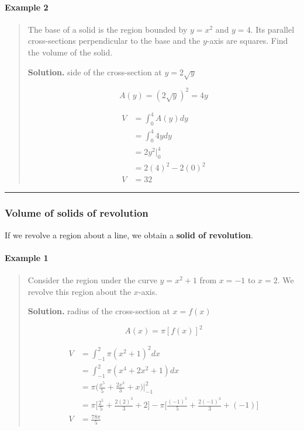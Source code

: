 \documentclass[
]{article}
\begin{document}
\hypertarget{example-2-2}{%
\paragraph*{Example 2}\label{example-2-2}}

\begin{quote}
The base of a solid is the region bounded by \(y=x^2\) and \(y=4\). Its
parallel cross-sections perpendicular to the base and the \(y\)-axis are
squares. Find the volume of the solid.

\textbf{Solution.} side of the cross-section at \(y = 2\sqrt{y}\)

\[ A(y) = (2\sqrt{y})^2 = 4y \]

\begin{align*}
V &= \int_0^4 A(y)dy \\
&=\int_0^4 4y dy \\
&= 2y^2 \Big|_0^4 \\
&= 2(4)^2 - 2(0)^2 \\
V &= 32
\end{align*}
\end{quote}

\begin{center}\rule{0.5\linewidth}{0.5pt}\end{center}

\hypertarget{volume-of-solids-of-revolution}{%
\subsubsection{Volume of solids of
revolution}\label{volume-of-solids-of-revolution}}

If we revolve a region about a line, we obtain a \textbf{solid of
revolution}.

\hypertarget{example-1-3}{%
\paragraph*{Example 1}\label{example-1-3}}

\begin{quote}
Consider the region under the curve \(y=x^2 +1\) from \(x=-1\) to
\(x=2\). We revolve this region about the \(x\)-axis.

\textbf{Solution.} radius of the cross-section at \(x = f(x)\)

\[ A(x) = \pi [f(x)]^2 \]

\begin{align*}
V &= \int_{-1}^2 \pi (x^2+1)^2 dx \\
&= \int_{-1}^2 \pi (x^4 +2x^2 +1) dx \\
&= \pi \Bigg(\frac{x^5}{5}+\frac{2x^3}{3}+x\Bigg) |_{-1}^2 \\
&= \pi\Bigg[\frac{2^5}{5}+\frac{2(2)^3}{3}+2\Bigg] - \pi\Bigg[\frac{(-1)^5}{5}+\frac{2(-1)^3}{3}+(-1)\Bigg] \\
V &= \frac{78\pi}{5}
\end{align*}
\end{quote}
\end{document}
